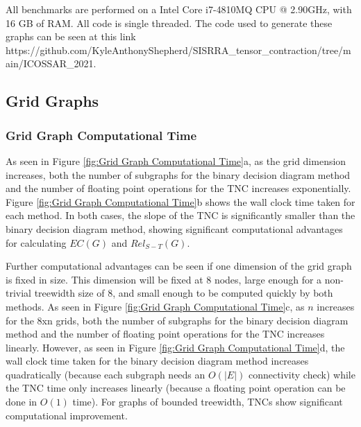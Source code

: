 All benchmarks are performed on a Intel Core i7-4810MQ CPU @ 2.90GHz, with 16 GB of RAM. All code is single threaded. The code used to generate these graphs can be seen at this link https://github.com/KyleAnthonyShepherd/SISRRA\_tensor\_contraction/tree/main/ICOSSAR\_2021.

\hypertarget{grid-graphs}{%
\subsection{Grid Graphs}\label{grid-graphs}}

\hypertarget{grid-graph-computational-time}{%
\subsubsection{Grid Graph Computational Time}\label{grid-graph-computational-time}}

As seen in Figure \ref{fig:Grid Graph Computational Time}a, as the grid dimension increases, both the number of subgraphs for the binary decision diagram method and the number of floating point operations for the TNC increases exponentially. Figure \ref{fig:Grid Graph Computational Time}b shows the wall clock time taken for each method. In both cases, the slope of the TNC is significantly smaller than the binary decision diagram method, showing significant computational advantages for calculating \(EC(G)\) and \(Rel_{S-T}(G)\).

Further computational advantages can be seen if one dimension of the grid graph is fixed in size. This dimension will be fixed at 8 nodes, large enough for a non-trivial treewidth size of 8, and small enough to be computed quickly by both methods. As seen in Figure \ref{fig:Grid Graph Computational Time}c, as \(n\) increases for the 8xn grids, both the number of subgraphs for the binary decision diagram method and the number of floating point operations for the TNC increases linearly. However, as seen in Figure \ref{fig:Grid Graph Computational Time}d, the wall clock time taken for the binary decision diagram method increases quadratically (because each subgraph needs an \(O(|E|)\) connectivity check) while the TNC time only increases linearly (because a floating point operation can be done in \(O(1)\) time). For graphs of bounded treewidth, TNCs show significant computational improvement.

